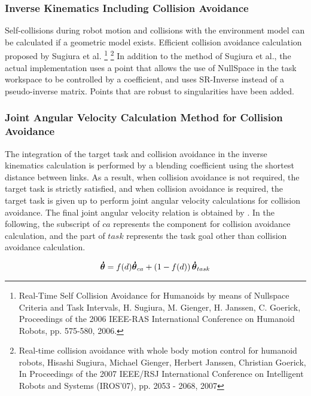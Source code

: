 \subsubsection{Inverse Kinematics Including Collision Avoidance}
Self-collisions during robot motion and collisions with the environment model can be calculated if a geometric model exists.
Efficient collision avoidance calculation proposed by Sugiura et al.
\footnote{
Real-Time Self Collision Avoidance for Humanoids by means of
Nullspace Criteria and Task Intervals, 
H. Sugiura, M. Gienger, H. Janssen, C. Goerick,
Proceedings of the 2006 IEEE-RAS International Conference on Humanoid Robots,
pp. 575-580, 2006.
}
\footnote{
\label{WholebodyCollisionAvoidance:Sugiura:IROS07}
Real-time collision avoidance with whole body motion control for
humanoid robots,
Hisashi Sugiura, Michael Gienger, Herbert Janssen, Christian Goerick,
In Proceedings of the 2007 IEEE/RSJ International Conference on Intelligent Robots and Systems (IROS'07), pp. 2053 - 2068, 2007
}
In addition to the method of Sugiura et al., the actual implementation uses a point that allows the use of NullSpace in the task workspace to be controlled by a coefficient, and uses SR-Inverse instead of a pseudo-inverse matrix. Points that are robust to singularities have been added.

\subsubsection{Joint Angular Velocity Calculation Method for Collision Avoidance}
The integration of the target task and collision avoidance in the inverse kinematics calculation is performed by a blending coefficient using the shortest distance between links.
As a result, when collision avoidance is not required, the target task is strictly satisfied, and when collision avoidance is required, the target task is given up to perform joint angular velocity calculations for collision avoidance.
The final joint angular velocity relation is obtained by .
In the following, the subscript of $ca$ represents the component for collision avoidance calculation, and the part of $task$ represents the task goal other than collision avoidance calculation.

\begin{equation}
\labeq{collision-avoidance-all}
\bm{\dot{\theta}} = f(d)\bm{\dot{\theta}}_{ca}
+ \left(1-f(d)\right)\bm{\dot{\theta}}_{task}
\end{equation}

